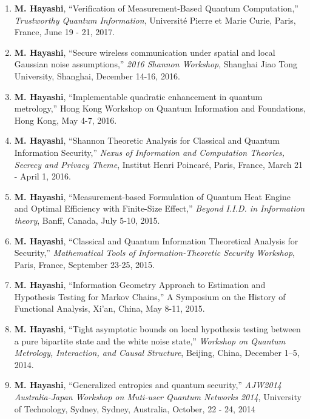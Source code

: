 \documentclass[a4paper,12pt,oneside]{article}
\begin{document}
\begin{enumerate}
\item 
\textbf{M. Hayashi}, ``Verification of Measurement-Based Quantum Computation,'' 
{\em Trustworthy Quantum Information}, 
Universit\'{e} Pierre et Marie Curie, Paris, France, June 19 - 21, 2017.

\item 
\textbf{M. Hayashi}, 
``Secure wireless communication under spatial and local Gaussian noise assumptions,'' 
{\em 2016 Shannon Workshop}, Shanghai Jiao Tong University, Shanghai, December 14-16, 2016.


\item 
\textbf{M. Hayashi}, ``Implementable quadratic enhancement in quantum metrology,'' 
Hong Kong Workshop on Quantum Information and Foundations, Hong Kong, May 4-7, 2016.


\item 
\textbf{M. Hayashi}, ``Shannon Theoretic Analysis for Classical and Quantum Information Security,'' 
{\em Nexus of Information and Computation Theories, Secrecy and Privacy Theme}, 
Institut Henri Poincar\'{e}, Paris, France, March 21 - April 1, 2016.



\item 
\textbf{M. Hayashi}, ``Measurement-based Formulation of Quantum Heat Engine and Optimal Efficiency with Finite-Size Effect,'' 
{\em Beyond I.I.D. in Information theory}, Banff, Canada, July 5-10, 2015.

\item 
\textbf{M. Hayashi}, ``Classical and Quantum Information Theoretical Analysis for Security,'' 
{\em Mathematical Tools of Information-Theoretic Security Workshop}, Paris, France, September 23-25, 2015.



\item 
\textbf{M. Hayashi},
``Information Geometry Approach to Estimation and Hypothesis Testing for Markov Chains,'' 
A Symposium on the History of Functional Analysis, Xi'an, 
China, May 8-11, 2015. 

\item 
\textbf{M. Hayashi}, 
``Tight asymptotic bounds on local hypothesis testing between a pure bipartite state and the white noise state,''
{\em Workshop on Quantum Metrology, Interaction, and Causal Structure},
Beijing, China, December 1--5, 2014. 

\item 
\textbf{M. Hayashi}, 
``Generalized entropies and quantum security,'' 
{\em AJW2014 Australia-Japan Workshop on Muti-user Quantum Networks 2014}, University of Technology, Sydney, Sydney, Australia, 
October, 22 - 24, 2014


\end{enumerate}
\end{document}
